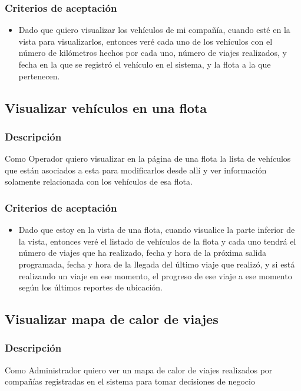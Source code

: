 \documentclass{article}
\begin{document}
\subsubsection{Criterios de aceptación}
\begin{itemize}
    \item Dado que quiero visualizar los vehículos de mi compañía, cuando esté en la vista para visualizarlos, entonces veré cada uno de los vehículos con el número de kilómetros hechos por cada uno, número de viajes realizados, y fecha en la que se registró el vehículo en el sistema, y la flota a la que pertenecen.
\end{itemize}

\subsection{Visualizar vehículos en una flota}
\subsubsection{Descripción}
Como Operador quiero visualizar en la página de una flota la lista de vehículos que están asociados a esta para modificarlos desde allí y ver información solamente relacionada con los vehículos de esa flota.  
\subsubsection{Criterios de aceptación}
\begin{itemize}
    \item Dado que estoy en la vista de una flota, cuando visualice la parte inferior de la vista, entonces veré el listado de vehículos de la flota y cada uno tendrá el número de viajes que ha realizado, fecha y hora de la próxima salida programada, fecha y hora de la llegada del último viaje que realizó, y si está realizando un viaje en ese momento, el progreso de ese viaje a ese momento según los últimos reportes de ubicación.
\end{itemize}

\subsection{Visualizar mapa de calor de viajes}
\subsubsection{Descripción}
Como Administrador quiero ver un mapa de calor de viajes realizados por compañías registradas en el sistema para tomar decisiones de negocio
\end{document}
